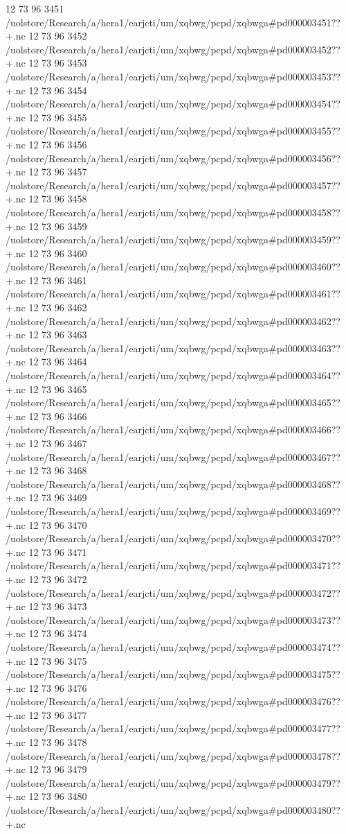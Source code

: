 12 73 96
3451
/uolstore/Research/a/hera1/earjcti/um/xqbwg/pcpd/xqbwga#pd000003451??+.nc
12 73 96
3452
/uolstore/Research/a/hera1/earjcti/um/xqbwg/pcpd/xqbwga#pd000003452??+.nc
12 73 96
3453
/uolstore/Research/a/hera1/earjcti/um/xqbwg/pcpd/xqbwga#pd000003453??+.nc
12 73 96
3454
/uolstore/Research/a/hera1/earjcti/um/xqbwg/pcpd/xqbwga#pd000003454??+.nc
12 73 96
3455
/uolstore/Research/a/hera1/earjcti/um/xqbwg/pcpd/xqbwga#pd000003455??+.nc
12 73 96
3456
/uolstore/Research/a/hera1/earjcti/um/xqbwg/pcpd/xqbwga#pd000003456??+.nc
12 73 96
3457
/uolstore/Research/a/hera1/earjcti/um/xqbwg/pcpd/xqbwga#pd000003457??+.nc
12 73 96
3458
/uolstore/Research/a/hera1/earjcti/um/xqbwg/pcpd/xqbwga#pd000003458??+.nc
12 73 96
3459
/uolstore/Research/a/hera1/earjcti/um/xqbwg/pcpd/xqbwga#pd000003459??+.nc
12 73 96
3460
/uolstore/Research/a/hera1/earjcti/um/xqbwg/pcpd/xqbwga#pd000003460??+.nc
12 73 96
3461
/uolstore/Research/a/hera1/earjcti/um/xqbwg/pcpd/xqbwga#pd000003461??+.nc
12 73 96
3462
/uolstore/Research/a/hera1/earjcti/um/xqbwg/pcpd/xqbwga#pd000003462??+.nc
12 73 96
3463
/uolstore/Research/a/hera1/earjcti/um/xqbwg/pcpd/xqbwga#pd000003463??+.nc
12 73 96
3464
/uolstore/Research/a/hera1/earjcti/um/xqbwg/pcpd/xqbwga#pd000003464??+.nc
12 73 96
3465
/uolstore/Research/a/hera1/earjcti/um/xqbwg/pcpd/xqbwga#pd000003465??+.nc
12 73 96
3466
/uolstore/Research/a/hera1/earjcti/um/xqbwg/pcpd/xqbwga#pd000003466??+.nc
12 73 96
3467
/uolstore/Research/a/hera1/earjcti/um/xqbwg/pcpd/xqbwga#pd000003467??+.nc
12 73 96
3468
/uolstore/Research/a/hera1/earjcti/um/xqbwg/pcpd/xqbwga#pd000003468??+.nc
12 73 96
3469
/uolstore/Research/a/hera1/earjcti/um/xqbwg/pcpd/xqbwga#pd000003469??+.nc
12 73 96
3470
/uolstore/Research/a/hera1/earjcti/um/xqbwg/pcpd/xqbwga#pd000003470??+.nc
12 73 96
3471
/uolstore/Research/a/hera1/earjcti/um/xqbwg/pcpd/xqbwga#pd000003471??+.nc
12 73 96
3472
/uolstore/Research/a/hera1/earjcti/um/xqbwg/pcpd/xqbwga#pd000003472??+.nc
12 73 96
3473
/uolstore/Research/a/hera1/earjcti/um/xqbwg/pcpd/xqbwga#pd000003473??+.nc
12 73 96
3474
/uolstore/Research/a/hera1/earjcti/um/xqbwg/pcpd/xqbwga#pd000003474??+.nc
12 73 96
3475
/uolstore/Research/a/hera1/earjcti/um/xqbwg/pcpd/xqbwga#pd000003475??+.nc
12 73 96
3476
/uolstore/Research/a/hera1/earjcti/um/xqbwg/pcpd/xqbwga#pd000003476??+.nc
12 73 96
3477
/uolstore/Research/a/hera1/earjcti/um/xqbwg/pcpd/xqbwga#pd000003477??+.nc
12 73 96
3478
/uolstore/Research/a/hera1/earjcti/um/xqbwg/pcpd/xqbwga#pd000003478??+.nc
12 73 96
3479
/uolstore/Research/a/hera1/earjcti/um/xqbwg/pcpd/xqbwga#pd000003479??+.nc
12 73 96
3480
/uolstore/Research/a/hera1/earjcti/um/xqbwg/pcpd/xqbwga#pd000003480??+.nc
